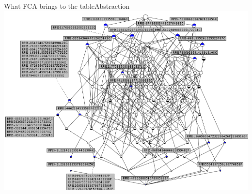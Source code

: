 \begin{frame}{What FCA brings to the table}{Abstraction}
\vspace{0pt}
\centering
\includegraphics[width=0.9\linewidth]{img/fca/lattice_abstraction}
\end{frame}


